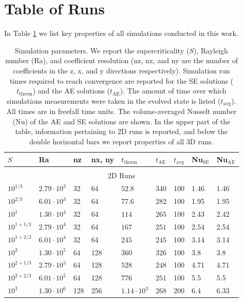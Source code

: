 \documentclass[aps, pre, onecolumn, nofootinbib, notitlepage, groupedaddress, amsfonts, amssymb, amsmath, longbibliography]{revtex4-1}
\begin{document}
\section{Table of Runs}
\label{appendix:run_table}
In Table \ref{table:run_parameters} we list key properties of all simulations
conducted in this work.  
\begin{table}
\caption{Simulation parameters. We report the supercriticality ($S$), Rayleigh number (Ra), 
and coefficient resolution (nz, nx, and ny are the number of coefficients in the
z, x, and y directions respectively).
Simulation run times required to reach convergence
are reported for the SE solutions ($t_{\text{therm}}$) and the AE solutions ($t_{\text{AE}}$).
The amount of time over which simulations measurements were taken in the evolved
state is listed ($t_{\text{avg}}$). All times are in freefall time units.  
The volume-averaged Nusselt number (Nu) of the
AE and SE solutions are shown.
In the upper part of the table, information pertaining to 2D runs is reported,
and below the double horizontal bars we report properties of all
3D runs.
}
\label{table:run_parameters}
\begin{center}
\begin{tabularx}{\textwidth}{ X X X X | X X X | X X }
\hline																	
$S$	&	Ra	&	nz	&	nx, ny	&	$t_{\text{therm}}$	&	$t_{\text{AE}}$	&	$t_{\text{avg}}$	&	Nu$_{\text{SE}}$	&	Nu$_{\text{AE}}$	\\
\hline \hline \\
\multicolumn{9}{c}{2D Runs} \\
\hline
$10^{1/3}$	&	$2.79 \cdot 10^3$	&	32	&	64	&	$52.8$	&	$340$	&	100	&	1.46	&	1.46	\\
$10^{2/3}$	&	$6.01 \cdot 10^3$	&	32	&	64	&	$77.6$	&	$282$	&	100	&	1.95	&	1.95	\\
$10^1$	&	$1.30 \cdot 10^4$	&	32	&	64	&	$114$	&	$265$	&	100	&	2.43	&	2.42	\\
$10^{1 + 1/3}$	&	$2.79 \cdot 10^4$	&	32	&	64	&	$167$	&	$251$	&	100	&	2.54	&	2.54	\\
$10^{1 + 2/3}$	&	$6.01 \cdot 10^4$	&	32	&	64	&	$245$	&	$245$	&	100	&	3.14	&	3.14	\\
$10^2$	&	$1.30 \cdot 10^5$	&	64	&	128	&	$360$	&	$326$	&	100	&	3.8	&	3.8	\\
$10^{2 + 1/3}$	&	$2.79 \cdot 10^5$	&	64	&	128	&	$528$	&	$248$	&	100	&	4.71	&	4.71	\\
$10^{2 + 2/3}$	&	$6.01 \cdot 10^5$	&	64	&	128	&	$776$	&	$251$	&	100	&	5.5	&	5.5	\\
$10^3$	&	$1.30 \cdot 10^6$	&	128	&	256	&	$1.14 \cdot 10^3$	&	$268$	&	200	&	6.4	&	6.33	\\

\end{tabularx}
\end{center}
\end{table}
\end{document}
